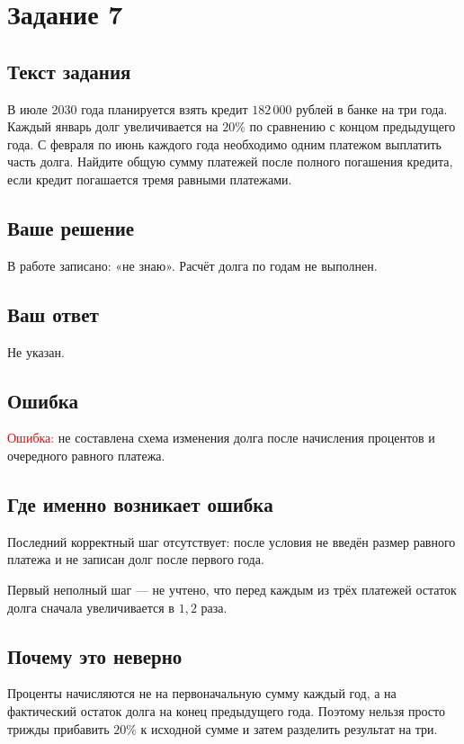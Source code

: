 \documentclass[12pt,a4paper]{article}
\begin{document}
\newpage
{}\label{task:7}
\section*{Задание 7}

\subsection*{Текст задания}
В июле 2030 года планируется взять кредит $182\,000$ рублей в банке на три года. Каждый январь долг увеличивается на $20\%$ по сравнению с концом предыдущего года. С февраля по июнь каждого года необходимо одним платежом выплатить часть долга. Найдите общую сумму платежей после полного погашения кредита, если кредит погашается тремя равными платежами.

\subsection*{Ваше решение}
В работе записано: «не знаю». Расчёт долга по годам не выполнен.

\subsection*{Ваш ответ}
Не указан.

\subsection*{Ошибка}
\textcolor{red}{Ошибка:} не составлена схема изменения долга после начисления процентов и очередного равного платежа.

\subsection*{Где именно возникает ошибка}
Последний корректный шаг отсутствует: после условия не введён размер равного платежа и не записан долг после первого года.

Первый неполный шаг --- не учтено, что перед каждым из трёх платежей остаток долга сначала увеличивается в $1{,}2$ раза.

\subsection*{Почему это неверно}
Проценты начисляются не на первоначальную сумму каждый год, а на фактический остаток долга на конец предыдущего года. Поэтому нельзя просто трижды прибавить $20\%$ к исходной сумме и затем разделить результат на три.
\end{document}
